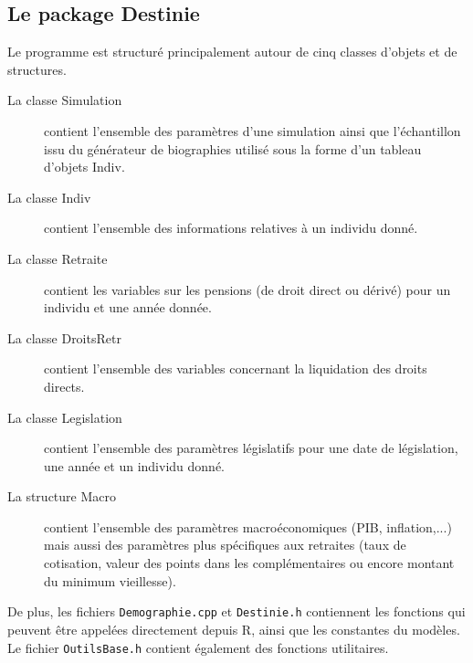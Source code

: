 \subsection{Le package Destinie}


Le programme est structuré principalement autour de cinq classes d'objets et de structures.\\
\begin{description}
\item[La classe Simulation] contient l'ensemble des paramètres d'une simulation ainsi que 
l'échantillon issu du générateur de biographies
utilisé sous la forme d'un tableau d'objets Indiv.
\item[La classe Indiv] contient l'ensemble des informations relatives à un individu donné.
\item[La classe Retraite] contient les variables sur les pensions (de droit direct ou dérivé) 
pour un individu et une année donnée.
\item[La classe DroitsRetr] contient l'ensemble des variables concernant la liquidation des
droits directs.
\item[La classe Legislation] contient l'ensemble des paramètres législatifs pour une 
date de législation, une année et un individu donné. 
\item[La structure Macro] contient l'ensemble des paramètres macroéconomiques (PIB, inflation,...) mais aussi des 
paramètres plus spécifiques aux retraites (taux de cotisation, valeur des points dans les complémentaires ou encore montant du minimum vieillesse).
\end{description}

De plus, les fichiers {\tt Demographie.cpp}  et {\tt Destinie.h} contiennent les fonctions qui peuvent être appelées directement depuis R,
ainsi que les constantes du modèles.
Le fichier {\tt OutilsBase.h} contient également des fonctions utilitaires.



\phantom{sdfgsdgf
sdfgsdg}

\medskip 


